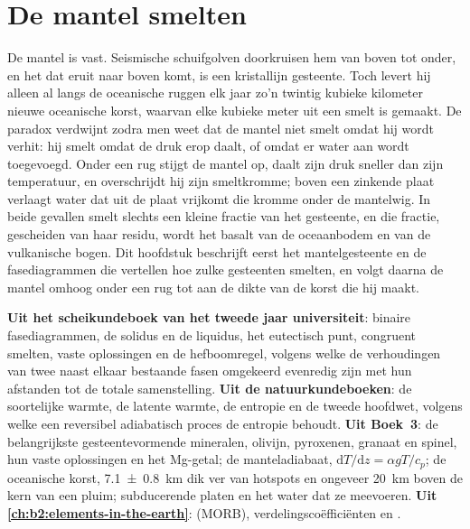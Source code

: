 \chapter{De mantel smelten}\label{ch:b2:mantle-melting}

De mantel is vast. Seismische schuifgolven doorkruisen hem van boven tot onder, en het
 dat eruit naar boven komt, is een kristallijn gesteente. Toch levert hij alleen al langs de
oceanische ruggen elk jaar zo'n twintig kubieke kilometer nieuwe oceanische korst,
waarvan elke kubieke meter uit een smelt is gemaakt. De paradox verdwijnt zodra men weet
dat de mantel niet smelt omdat hij wordt verhit: hij smelt omdat de
druk erop daalt, of omdat er water aan wordt toegevoegd. Onder een rug
stijgt de mantel op, daalt zijn druk sneller dan zijn temperatuur, en overschrijdt hij zijn
smeltkromme; boven een zinkende plaat verlaagt water dat uit de plaat vrijkomt die
kromme onder de mantelwig. In beide gevallen smelt slechts een kleine fractie van het gesteente,
en die fractie, gescheiden van haar residu, wordt het basalt van de
oceaanbodem en van de vulkanische bogen. Dit hoofdstuk beschrijft eerst het
mantelgesteente en de fasediagrammen die vertellen hoe zulke gesteenten smelten, en volgt daarna de
mantel omhoog onder een rug tot aan de dikte van de korst die hij maakt.

\begin{recall}
\textbf{Uit het scheikundeboek van het tweede jaar universiteit}: binaire fasediagrammen, de
solidus en de liquidus, het eutectisch punt, congruent smelten, vaste oplossingen
en de hefboomregel, volgens welke de verhoudingen van twee naast elkaar bestaande fasen
omgekeerd evenredig zijn met hun afstanden tot de totale samenstelling.
\textbf{Uit de natuurkundeboeken}: de soortelijke warmte, de latente warmte, de entropie
en de tweede hoofdwet, volgens welke een reversibel adiabatisch proces de entropie behoudt.
\textbf{Uit Boek~3}: de belangrijkste gesteentevormende mineralen, olivijn,
pyroxenen, granaat en spinel, hun vaste oplossingen en het Mg-getal; de
manteladiabaat, $\mathrm dT/\mathrm dz = \alpha gT/c_p$; de oceanische korst,
\qty[uncertainty-mode=separate]{7.1 \pm 0.8}{km} dik ver van hotspots en
ongeveer \qty{20}{km} boven de kern van een pluim; subducerende platen en het water dat ze
meevoeren. \textbf{Uit \cref{ch:b2:elements-in-the-earth}}: 
(MORB), verdelingscoëfficiënten en .
\end{recall}

